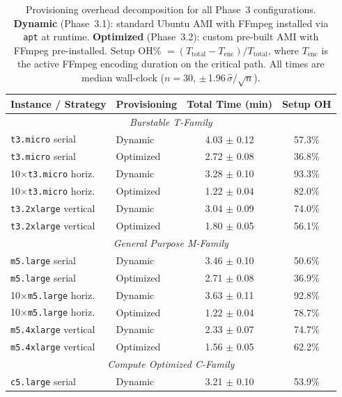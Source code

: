 \documentclass[conference]{IEEEtran}
\begin{document}
\begin{table}[!htbp]
\centering
\caption{Provisioning overhead decomposition for all Phase~3 configurations.
\textbf{Dynamic} (Phase~3.1): standard Ubuntu AMI with FFmpeg installed via
\texttt{apt} at runtime. \textbf{Optimized} (Phase~3.2): custom pre-built AMI
with FFmpeg pre-installed. Setup OH\% $= (T_{\mathrm{total}} -
T_{\mathrm{enc}}) / T_{\mathrm{total}}$, where $T_{\mathrm{enc}}$ is the
active FFmpeg encoding duration on the critical path. All times are median
wall-clock ($n=30$, $\pm$\,1.96\,$\hat{\sigma}/\sqrt{n}$).}
\label{tab:app_overhead}
\small
\begin{tabular}{llcc}
\toprule
\textbf{Instance / Strategy} & \textbf{Provisioning} & \textbf{Total Time (min)} & \textbf{Setup OH} \\
\midrule
\multicolumn{4}{c}{\textit{Burstable T-Family}} \\
\midrule
\texttt{t3.micro} serial          & Dynamic   & 4.03 $\pm$ 0.12 & 57.3\% \\
\texttt{t3.micro} serial          & Optimized & 2.72 $\pm$ 0.08 & 36.8\% \\
10$\times$\texttt{t3.micro} horiz.& Dynamic   & 3.28 $\pm$ 0.10 & 93.3\% \\
10$\times$\texttt{t3.micro} horiz.& Optimized & 1.22 $\pm$ 0.04 & 82.0\% \\
\texttt{t3.2xlarge} vertical      & Dynamic   & 3.04 $\pm$ 0.09 & 74.0\% \\
\texttt{t3.2xlarge} vertical      & Optimized & 1.80 $\pm$ 0.05 & 56.1\% \\
\midrule
\multicolumn{4}{c}{\textit{General Purpose M-Family}} \\
\midrule
\texttt{m5.large} serial          & Dynamic   & 3.46 $\pm$ 0.10 & 50.6\% \\
\texttt{m5.large} serial          & Optimized & 2.71 $\pm$ 0.08 & 36.9\% \\
10$\times$\texttt{m5.large} horiz.& Dynamic   & 3.63 $\pm$ 0.11 & 92.8\% \\
10$\times$\texttt{m5.large} horiz.& Optimized & 1.22 $\pm$ 0.04 & 78.7\% \\
\texttt{m5.4xlarge} vertical      & Dynamic   & 2.33 $\pm$ 0.07 & 74.7\% \\
\texttt{m5.4xlarge} vertical      & Optimized & 1.56 $\pm$ 0.05 & 62.2\% \\
\midrule
\multicolumn{4}{c}{\textit{Compute Optimized C-Family}} \\
\midrule
\texttt{c5.large} serial          & Dynamic   & 3.21 $\pm$ 0.10 & 53.9\% \\

\end{tabular}
\end{table}
\end{document}
